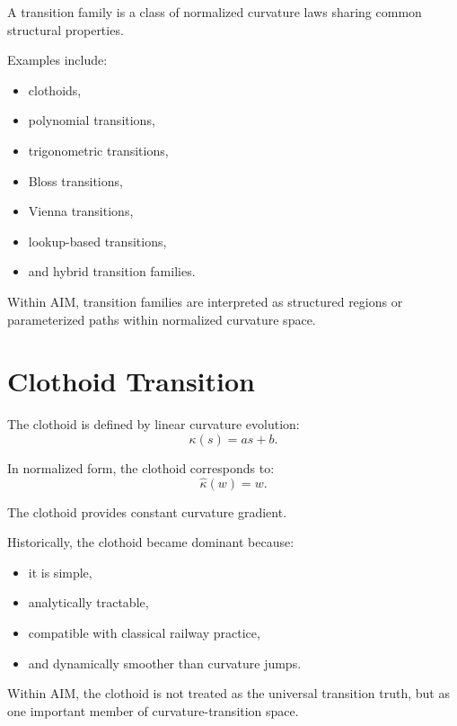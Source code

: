 \begin{definition}
\label{def:transition-family}
A transition family is a class of normalized curvature laws sharing
common structural properties.
\end{definition}

Examples include:
\begin{itemize}
\item clothoids,
\item polynomial transitions,
\item trigonometric transitions,
\item Bloss transitions,
\item Vienna transitions,
\item lookup-based transitions,
\item and hybrid transition families.
\end{itemize}

Within AIM, transition families are interpreted as structured regions or
parameterized paths within normalized curvature space.

\section{Clothoid Transition}

\begin{definition}[Clothoid]
\label{def:clothoid-transition}
The clothoid is defined by linear curvature evolution:
\[
\kappa(s)
=
a s + b.
\]
\end{definition}

In normalized form, the clothoid corresponds to:
\[
\hat\kappa(w)=w.
\]

The clothoid provides constant curvature gradient.

Historically, the clothoid became dominant because:
\begin{itemize}
\item it is simple,
\item analytically tractable,
\item compatible with classical railway practice,
\item and dynamically smoother than curvature jumps.
\end{itemize}

Within AIM, the clothoid is not treated as the universal transition
truth, but as one important member of curvature-transition space.

